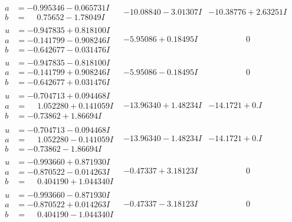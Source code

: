 \documentclass[1p]{elsarticle_modified}
\theoremstyle{definition}
\begin{document}
$$\begin{array}{c|c|c}
\begin{aligned}
a &= -0.995346 - 0.065731 I \\
b &= \phantom{-}0.75652 - 1.78049 I\end{aligned}
 & -10.08840 - 3.01307 I & -10.38776 + 2.63251 I \\ \hline\begin{aligned}
u &= -0.947835 + 0.818100 I \\
a &= -0.141799 - 0.908246 I \\
b &= -0.642677 - 0.031476 I\end{aligned}
 & -5.95086 + 0.18495 I & \phantom{-0.000000 } 0 \\ \hline\begin{aligned}
u &= -0.947835 - 0.818100 I \\
a &= -0.141799 + 0.908246 I \\
b &= -0.642677 + 0.031476 I\end{aligned}
 & -5.95086 - 0.18495 I & \phantom{-0.000000 } 0 \\ \hline\begin{aligned}
u &= -0.704713 + 0.094468 I \\
a &= \phantom{-}1.052280 + 0.141059 I \\
b &= -0.73862 + 1.86694 I\end{aligned}
 & -13.96340 + 1.48234 I & -14.1721 + 0. I\phantom{ +0.000000I} \\ \hline\begin{aligned}
u &= -0.704713 - 0.094468 I \\
a &= \phantom{-}1.052280 - 0.141059 I \\
b &= -0.73862 - 1.86694 I\end{aligned}
 & -13.96340 - 1.48234 I & -14.1721 + 0. I\phantom{ +0.000000I} \\ \hline\begin{aligned}
u &= -0.993660 + 0.871930 I \\
a &= -0.870522 - 0.014263 I \\
b &= \phantom{-}0.404190 + 1.044340 I\end{aligned}
 & -0.47337 + 3.18123 I & \phantom{-0.000000 } 0 \\ \hline\begin{aligned}
u &= -0.993660 - 0.871930 I \\
a &= -0.870522 + 0.014263 I \\
b &= \phantom{-}0.404190 - 1.044340 I\end{aligned}
 & -0.47337 - 3.18123 I & \phantom{-0.000000 } 0 \\ \hline\begin{aligned}

\end{aligned}
\end{array}$$
\end{document}
